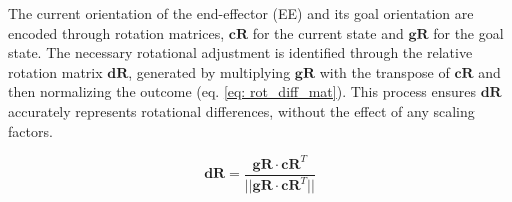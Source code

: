 \documentclass[letterpaper, 10 pt, conference]{ieeeconf}  %
\begin{document}

%

The current orientation of the end-effector (EE) and its goal orientation are encoded through rotation matrices, \(\mathbf{cR}\) for the current state and \(\mathbf{gR}\) for the goal state. The necessary rotational adjustment is identified through the relative rotation matrix \(\mathbf{dR}\), generated by multiplying \(\mathbf{gR}\) with the transpose of \(\mathbf{cR}\) and then normalizing the outcome (eq. \ref{eq: rot_diff_mat}). This process ensures \(\mathbf{dR}\) accurately represents rotational differences, without the effect of any scaling factors.



\begin{equation}
	\mathbf{dR} = \frac{\mathbf{gR} \cdot \mathbf{cR}^{T}}{||\mathbf{gR} \cdot \mathbf{cR}^{T}||}
	\label{eq: rot_diff_mat}
\end{equation}
\end{document}
